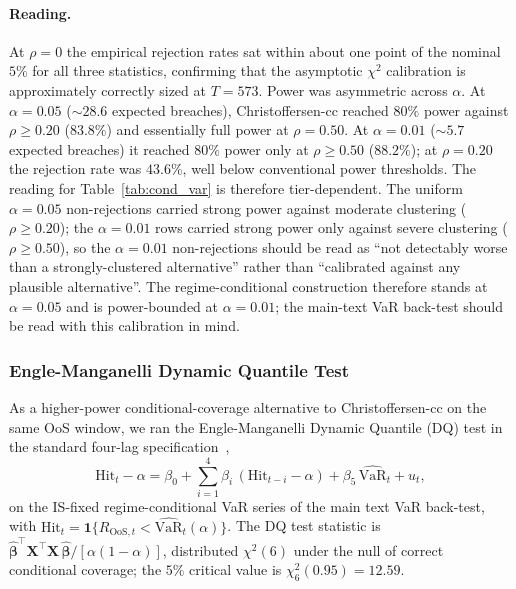 \paragraph{Reading.}
At $\rho = 0$ the empirical rejection rates sat within about one point of the nominal $5\%$ for all three statistics, confirming that the asymptotic $\chi^2$ calibration is approximately correctly sized at $T = 573$. Power was asymmetric across $\alpha$. At $\alpha = 0.05$ ($\sim 28.6$ expected breaches), Christoffersen-cc reached $80\%$ power against $\rho \ge 0.20$ ($83.8\%$) and essentially full power at $\rho = 0.50$. At $\alpha = 0.01$ ($\sim 5.7$ expected breaches) it reached $80\%$ power only at $\rho \ge 0.50$ ($88.2\%$); at $\rho = 0.20$ the rejection rate was $43.6\%$, well below conventional power thresholds.
The reading for Table~\ref{tab:cond_var} is therefore tier-dependent. The uniform $\alpha = 0.05$ non-rejections carried strong power against moderate clustering ($\rho \ge 0.20$); the $\alpha = 0.01$ rows carried strong power only against severe clustering ($\rho \ge 0.50$), so the $\alpha = 0.01$ non-rejections should be read as ``not detectably worse than a strongly-clustered alternative'' rather than ``calibrated against any plausible alternative''. The regime-conditional construction therefore stands at $\alpha = 0.05$ and is power-bounded at $\alpha = 0.01$; the main-text VaR back-test should be read with this calibration in mind.

\subsubsection{Engle-Manganelli Dynamic Quantile Test}
\label{sec:engle_manganelli_dq}

As a higher-power conditional-coverage alternative to Christoffersen-cc on the same OoS window, we ran the Engle-Manganelli Dynamic Quantile (DQ) test in the standard four-lag specification~\citep{engle2004caviar},
\begin{equation}
    \text{Hit}_t - \alpha
    = \beta_0 + \sum_{i = 1}^{4} \beta_i\,(\text{Hit}_{t-i} - \alpha) + \beta_{5}\,\widehat{\text{VaR}}_t + u_t,
    \label{eq:dq_regression}
\end{equation}
on the IS-fixed regime-conditional VaR series of the main text VaR back-test, with $\text{Hit}_t = \mathbf 1\{R_{\text{OoS},t} < \widehat{\text{VaR}}_t(\alpha)\}$. The DQ test statistic is $\widehat{\boldsymbol\beta}^\top \mathbf X^\top \mathbf X\,\widehat{\boldsymbol\beta} / [\alpha(1-\alpha)]$, distributed $\chi^2(6)$ under the null of correct conditional coverage; the $5\%$ critical value is $\chi^2_6(0.95) = 12.59$.

